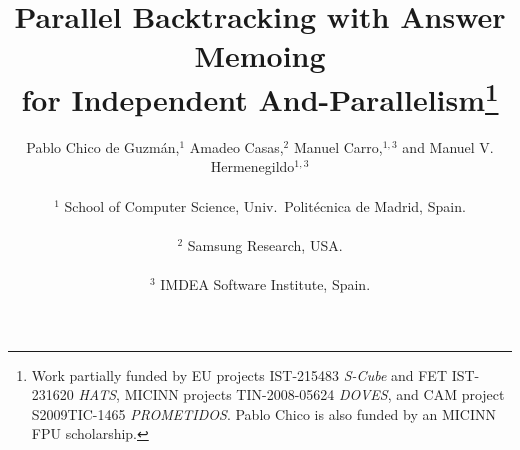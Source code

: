 \documentclass{tlp}
\begin{document}
\title[]{\vspace{-1em}Parallel Backtracking with Answer Memoing \\
  for Independent And-Parallelism\thanks{
Work partially funded by
EU projects IST-215483 {\em S-Cube} and 
FET IST-231620 {\em HATS}, 
MICINN projects TIN-2008-05624 {\em DOVES},
and CAM project S2009TIC-1465 {\em PROMETIDOS}. Pablo Chico is also
funded by an MICINN FPU 
scholarship.}}



\author[]
       {Pablo Chico de Guzm\'{a}n,$^1$ Amadeo Casas,$^2$ Manuel Carro,$^{1,3}$
        and Manuel V. Hermenegildo$^{1,3}$\\ \ \\
$^1$ School of Computer Science, Univ.\ Polit\'ecnica de Madrid, Spain.\\
     \\ 
$^2$ Samsung Research, USA.\\
     \\ 
$^3$ IMDEA Software Institute, Spain.\\
}











\pagerange{\pageref{firstpage}--\pageref{lastpage}}
\setcounter{page}{1}

\maketitle
\end{document}
